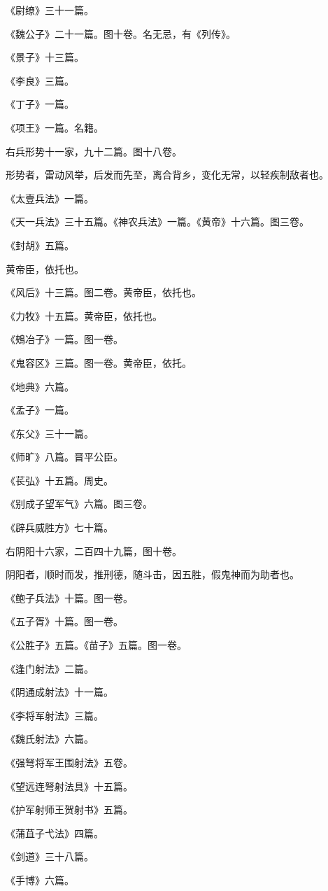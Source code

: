 \documentclass[]{article}
\begin{document}
《尉缭》三十一篇。

《魏公子》二十一篇。图十卷。名无忌，有《列传》。

《景子》十三篇。

《李良》三篇。

《丁子》一篇。

《项王》一篇。名籍。

右兵形势十一家，九十二篇。图十八卷。

形势者，雷动风举，后发而先至，离合背乡，变化无常，以轻疾制敌者也。

《太壹兵法》一篇。

《天一兵法》三十五篇。《神农兵法》一篇。《黄帝》十六篇。图三卷。

《封胡》五篇。

黄帝臣，依托也。

《风后》十三篇。图二卷。黄帝臣，依托也。

《力牧》十五篇。黄帝臣，依托也。

《鵊冶子》一篇。图一卷。

《鬼容区》三篇。图一卷。黄帝臣，依托。

《地典》六篇。

《孟子》一篇。

《东父》三十一篇。

《师旷》八篇。晋平公臣。

《苌弘》十五篇。周史。

《别成子望军气》六篇。图三卷。

《辟兵威胜方》七十篇。

右阴阳十六家，二百四十九篇，图十卷。

阴阳者，顺时而发，推刑德，随斗击，因五胜，假鬼神而为助者也。

《鲍子兵法》十篇。图一卷。

《五子胥》十篇。图一卷。

《公胜子》五篇。《苗子》五篇。图一卷。

《逢门射法》二篇。

《阴通成射法》十一篇。

《李将军射法》三篇。

《魏氏射法》六篇。

《强弩将军王围射法》五卷。

《望远连弩射法具》十五篇。

《护军射师王贺射书》五篇。

《蒲苴子弋法》四篇。

《剑道》三十八篇。

《手博》六篇。
\end{document}
